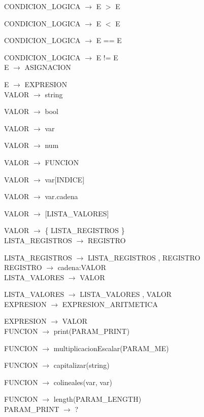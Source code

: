 \documentclass[10pt,a4paper]{article}
\begin{document}
CONDICION\_LOGICA $\rightarrow$ E $>$ E   

CONDICION\_LOGICA $\rightarrow$ E $<$ E   

CONDICION\_LOGICA $\rightarrow$ E == E   

CONDICION\_LOGICA $\rightarrow$ E != E \\

E $\rightarrow$ ASIGNACION   

E $\rightarrow$ EXPRESION \\

VALOR $\rightarrow$ string   

VALOR $\rightarrow$ bool   

VALOR $\rightarrow$ var   

VALOR $\rightarrow$ num   

VALOR $\rightarrow$ FUNCION   

VALOR $\rightarrow$ var[INDICE]   

VALOR $\rightarrow$ var.cadena   

VALOR $\rightarrow$ [LISTA\_VALORES]   

VALOR $\rightarrow$ \{ LISTA\_REGISTROS \}\\

LISTA\_REGISTROS $\rightarrow$ REGISTRO  

LISTA\_REGISTROS $\rightarrow$ LISTA\_REGISTROS , REGISTRO \\

REGISTRO $\rightarrow$ cadena:VALOR \\

LISTA\_VALORES $\rightarrow$ VALOR   

LISTA\_VALORES $\rightarrow$ LISTA\_VALORES , VALOR \\

EXPRESION $\rightarrow$ EXPRESION\_ARITMETICA   

EXPRESION $\rightarrow$ VALOR \\

FUNCION $\rightarrow$ print(PARAM\_PRINT)   

FUNCION $\rightarrow$ multiplicacionEscalar(PARAM\_ME)   

FUNCION $\rightarrow$ capitalizar(string)   

FUNCION $\rightarrow$ colineales(var, var)   

FUNCION $\rightarrow$ length(PARAM\_LENGTH) \\

PARAM\_PRINT $\rightarrow$ ? \\
\end{document}
